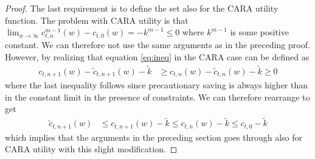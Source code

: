 \begin{proof}
	The last requirement is to define the set also for the CARA utility function. The problem with CARA utility is that $\lim_{w\rightarrow \infty} c_{t,n}^{m-1}(w) - c_{t,0}(w) = - k^{m-1} \leq 0$ where $k^{m-1}$ is some positive constant. We can therefore not use the same arguments as in the preceding proof. However, by realizing that equation \eqref{eq:ineq} in the CARA case can be defined as
	\begin{align*}
	c_{t,n+1}(w) - \tilde{c}_{t,n+1}(w) - \tilde{k} &\geq c_{t,n}(w)-\tilde{c}_{t,n}(w) -  \tilde{k} \geq 0
	\end{align*}
	where the last inequality follows since precautionary saving is always higher than in the constant limit in the presence of constraints. We can therefore rearrange to get
	\begin{align*}
	\tilde{c}_{t,n+1}(w)  &\leq c_{t,n+1}(w) - \tilde{k} \leq c_{t,n}(w) - \tilde{k} \leq c_{t,0} - \tilde{k}	\end{align*}
	which implies that the arguments in the preceding section goes through also for CARA utility with this slight modification.
	
\end{proof}

